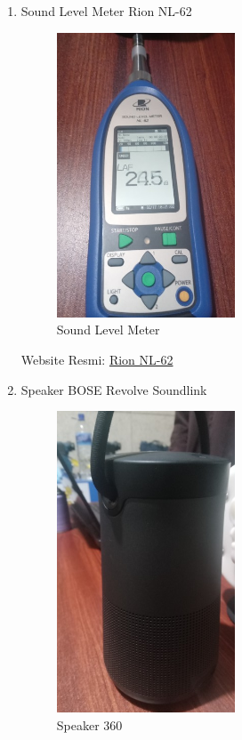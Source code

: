 \documentclass[12pt]{book}
\begin{document}
	\begin{enumerate}
		\item Sound Level Meter Rion NL-62
		\begin{figure}[!ht]
			\centering
			\includegraphics[width=0.5\textwidth]{images/perangkat/rion_nl62}
			\caption{Sound Level Meter}
		\end{figure}

		Website Resmi: \href{https://rion-sv.com/products/10005/NL620009}{Rion NL-62}

		\item Speaker BOSE Revolve Soundlink
		\begin{figure}[!ht]
			\centering
			\includegraphics[width=0.5\textwidth,angle=-90]{images/perangkat/bose}
			\caption{Speaker 360}
		\end{figure}


\end{enumerate}
\end{document}
